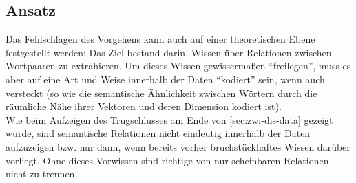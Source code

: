 \subsection{Ansatz}

Das Fehlschlagen des Vorgehens kann auch auf einer theoretischen Ebene festgestellt werden: Das Ziel bestand darin, Wissen
über Relationen zwischen Wortpaaren zu extrahieren. Um dieses Wissen gewissermaßen ``freilegen'', muss es aber auf eine
Art und Weise innerhalb der Daten ``kodiert'' sein, wenn auch versteckt (so wie die semantische Ähnlichkeit zwischen Wörtern
durch die räumliche Nähe ihrer Vektoren und deren Dimension kodiert ist).\\
Wie beim Aufzeigen des Trugschlusses am Ende von \ref{sec:zwi-dis-data} gezeigt wurde, sind semantische Relationen nicht eindeutig
innerhalb der Daten aufzuzeigen bzw. nur dann, wenn bereits vorher bruchstückhaftes Wissen darüber vorliegt. Ohne
dieses Vorwissen sind richtige von nur scheinbaren Relationen nicht zu trennen.

